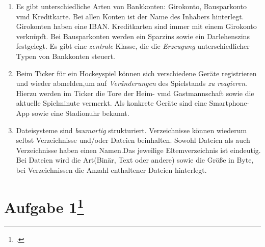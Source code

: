\documentclass{lehramt-informatik}
\begin{document}
\begin{enumerate}
\item Es gibt unterschiedliche Arten von Bankkonten: Girokonto,
Bausparkonto vmd Kreditkarte. Bei allen Konten ist der Name des Inhabers
hinterlegt. Girokonten haben eine IBAN. Kreditkarten sind immer mit
einem Girokonto verknüpft. Bei Bausparkonten werden ein Sparzins sowie
ein Darlehenszins festgelegt. Es gibt eine \emph{zentrale} Klasse, die
die \emph{Erzeugung} unterschiedlicher Typen von Bankkonten steuert.

\item Beim Ticker für ein Hockeyspiel können sich verschiedene Geräte
registrieren und wieder abmelden,um auf \emph{Veränderungen} des
Spielstands \emph{zu reagieren}. Hierzu werden im Ticker die Tore der
Heim- vmd Gastmannschaft sowie die aktuelle Spielminute vermerkt. Als
konkrete Geräte sind eine Smartphone-App sowie eine Stadionuhr bekannt.

\item Dateisysteme sind \emph{baumartig} strukturiert. Verzeichnisse
können wiederum selbst Verzeichnisse und/oder Dateien beinhalten. Sowohl
Dateien als auch Verzeichnisse haben einen Namen.Das jeweilige
Eltemverzeichnis ist eindeutig. Bei Dateien wird die Art(Binär, Text
oder andere) sowie die Größe in Byte, bei Verzeichnissen die Anzahl
enthaltener Dateien hinterlegt.
\end{enumerate}

%

\section{Aufgabe 1\footcite{sosy:ab:6}}
\end{document}
